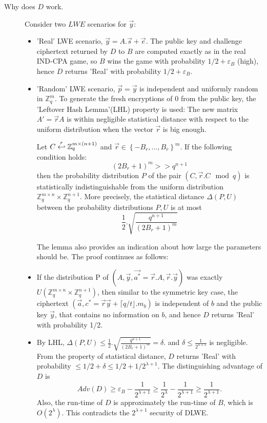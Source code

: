 \begin{description}
\begin{description}
  \item [Why does $D$ work.] Consider two $LWE$ scenarios for $\vec{y}$:
    \begin{itemize}
    \item 'Real' LWE scenario, $\vec{y} = A.\vec{s} + \vec{e}$. The public key
      and challenge ciphertext returned by $D$ to $B$ are computed exactly as in
      the real IND-CPA game, so $B$ wins the game with probability
      $1/2 + \varepsilon_B$ (high), hence $D$ returns 'Real' with probability
      $1/2 + \varepsilon_B$.
    \item 'Random' LWE scenario, $\vec{p} = \vec{y}$ is independent and
      uniformly random in $\mathbb{Z}_q^m$. To generate the fresh
      encryptions of 0 from the public key, the 'Leftover Hash
      Lemma'(LHL) property is used: The new matrix $A' = \vec{r}A$ is
      within negligible statistical distance with respect to the uniform distribution when the vector $\vec{r}$ is big enough.
      \begin{lemma}
          Let
        $C \stackrel{r}{\hookleftarrow} \mathbb{Z}_q^{m \times (n+1)}$ and
        $\vec{r} \in \left\{ -B_r, \dots, B_r \right\}^m$. If the following
        condition holds:
        \[
          (2B_r + 1)^m >> q^{n+1}
        \]
        then the probability distribution $P$ of the pair
        $(C, \vec{r}.C \mod q)$ is statistically indistinguishable from the
        uniform distribution
        $\mathbb{Z}_q^{m \times n} \times \mathbb{Z}_q^{n+1}$. More precisely,
        the statistical distance $\Delta(P,U)$ between the probability
        distributions $P,U$ is at most
        \[
          \frac{1}{2} . \sqrt{\frac{q^{n+1}}{(2B_r + 1)^m}}
        \]
        \label{lem:LHL}
      \end{lemma}
      The lemma also provides an indication about how large the parameters should
      be. The proof continues as follows:
    \item If the distribution P of
      $(A, \vec{y}, \vec{a^*} = \vec{r} . A, \vec{r}. \vec{y})$ was exactly
      $U(\mathbb{Z}_q^{m \times n} \times \mathbb{Z}_q^{n+1})$, then similar to
      the symmetric key case, the ciphertext
      $(\vec{a}, c^* = \vec{r}\vec{y} + \lceil q/t \rfloor.m_b)$ is independent
      of $b$ and the public key $\vec{y}$, that contains no information on $b$,
      and hence $D$ returns 'Real' with probability 1/2.
    \item By LHL,
      $\Delta(P,U) \leq \frac{1}{2}.
      \sqrt{\frac{q^{n+1}}{(2B_r+1)^m}}=\delta$. and
      $\delta \leq \frac{1}{2^{\lambda+1}}$ is negligible. From the property of
      statistical distance, $D$ returns 'Real' with probability
      $\leq 1/2 + \delta \leq 1/2 + 1/2^{\lambda+1}$. The distinguishing
      advantage of $D$ is
      \[
        Adv(D) \geq \varepsilon_B - \frac{1}{2^{\lambda+1}} \geq
        \frac{1}{2^\lambda} - \frac{1}{2^{\lambda+1}} \geq
        \frac{1}{2^{\lambda+1}}.
      \]
      Also, the run-time of $D$ is approximately the run-time of $B$, which is
      $O\left( 2^\lambda \right)$. This contradicts the $2^{\lambda + 1}$
      security of DLWE.


\end{itemize}
\end{description}
\end{description}
